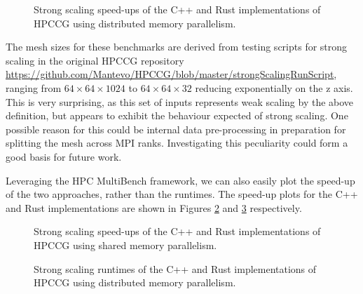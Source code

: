 \begin{figure}[H]
    \centering
    
    \vspace*{-0.5cm}
    \caption{Strong scaling speed-ups of the C++ and Rust implementations of HPCCG using distributed memory parallelism.}
    \label{fig:strong_scaling_mpi}
\end{figure}

The mesh sizes for these benchmarks are derived from testing scripts for strong scaling in the original HPCCG repository \url{https://github.com/Mantevo/HPCCG/blob/master/strongScalingRunScript}, ranging from $64 \times 64 \times 1024$ to $64 \times 64 \times 32$ reducing exponentially on the z axis. This is very surprising, as this set of inputs represents weak scaling by the above definition, but appears to exhibit the behaviour expected of strong scaling. One possible reason for this could be internal data pre-processing in preparation for splitting the mesh across MPI ranks. Investigating this peculiarity could form a good basis for future work.

Leveraging the HPC MultiBench framework, we can also easily plot the speed-up of the two approaches, rather than the runtimes. The speed-up plots for the C++ and Rust implementations are shown in Figures \ref{fig:strong_scaling_speedup_threaded} and \ref{fig:strong_scaling_speedup_mpi} respectively.

\begin{figure}[H]
    \centering
    
    \vspace*{-0.5cm}
    \caption{Strong scaling speed-ups of the C++ and Rust implementations of HPCCG using shared memory parallelism.}
    \label{fig:strong_scaling_speedup_threaded}
\end{figure}

\begin{figure}[H]
    \centering
    
    \vspace*{-0.5cm}
    \caption{Strong scaling runtimes of the C++ and Rust implementations of HPCCG using distributed memory parallelism.}
    \label{fig:strong_scaling_speedup_mpi}
\end{figure}

